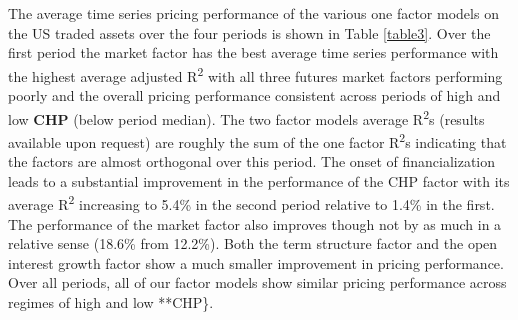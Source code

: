 \documentclass[]{elsarticle} %
\begin{document}
The average time series pricing performance of the various one factor
models on the US traded assets over the four periods is shown in Table
\ref{table3}. Over the first period the market factor has the best
average time series performance with the highest average adjusted
R\textsuperscript{2} with all three futures market factors performing
poorly and the overall pricing performance consistent across periods of
high and low \textbf{CHP} (below period median). The two factor models
average R\textsuperscript{2}s (results available upon request) are
roughly the sum of the one factor R\textsuperscript{2}s indicating that
the factors are almost orthogonal over this period. The onset of
financialization leads to a substantial improvement in the performance
of the CHP factor with its average R\textsuperscript{2} increasing to
5.4\% in the second period relative to 1.4\% in the first. The
performance of the market factor also improves though not by as much in
a relative sense (18.6\% from 12.2\%). Both the term structure factor
and the open interest growth factor show a much smaller improvement in
pricing performance. Over all periods, all of our factor models show
similar pricing performance across regimes of high and low **CHP\}.
\end{document}
